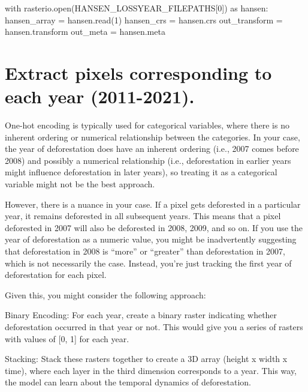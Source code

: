 \documentclass[
  letterpaper,
  DIV=11,
  numbers=noendperiod]{scrartcl}
\newenvironment{Shaded}{\begin{snugshade}}{\end{snugshade}}
\newcommand{\BuiltInTok}[1]{\textcolor[rgb]{0.00,0.23,0.31}{#1}}
\newcommand{\ControlFlowTok}[1]{\textcolor[rgb]{0.00,0.23,0.31}{#1}}
\newcommand{\DecValTok}[1]{\textcolor[rgb]{0.68,0.00,0.00}{#1}}
\newcommand{\ImportTok}[1]{\textcolor[rgb]{0.00,0.46,0.62}{#1}}
\newcommand{\NormalTok}[1]{\textcolor[rgb]{0.00,0.23,0.31}{#1}}
\newcommand{\OperatorTok}[1]{\textcolor[rgb]{0.37,0.37,0.37}{#1}}
\begin{document}
\begin{Shaded}
\begin{Highlighting}[]
\ControlFlowTok{with}\NormalTok{ rasterio.}\BuiltInTok{open}\NormalTok{(HANSEN\_LOSSYEAR\_FILEPATHS[}\DecValTok{0}\NormalTok{]) }\ImportTok{as}\NormalTok{ hansen:}
\NormalTok{    hansen\_array }\OperatorTok{=}\NormalTok{ hansen.read(}\DecValTok{1}\NormalTok{)}
\NormalTok{    hansen\_crs }\OperatorTok{=}\NormalTok{ hansen.crs}
\NormalTok{    out\_transform }\OperatorTok{=}\NormalTok{ hansen.transform}
\NormalTok{    out\_meta }\OperatorTok{=}\NormalTok{ hansen.meta}
\end{Highlighting}
\end{Shaded}

\hypertarget{extract-pixels-corresponding-to-each-year-2011-2021.}{%
\section{Extract pixels corresponding to each year
(2011-2021).}\label{extract-pixels-corresponding-to-each-year-2011-2021.}}

One-hot encoding is typically used for categorical variables, where
there is no inherent ordering or numerical relationship between the
categories. In your case, the year of deforestation does have an
inherent ordering (i.e., 2007 comes before 2008) and possibly a
numerical relationship (i.e., deforestation in earlier years might
influence deforestation in later years), so treating it as a categorical
variable might not be the best approach.

However, there is a nuance in your case. If a pixel gets deforested in a
particular year, it remains deforested in all subsequent years. This
means that a pixel deforested in 2007 will also be deforested in 2008,
2009, and so on. If you use the year of deforestation as a numeric
value, you might be inadvertently suggesting that deforestation in 2008
is ``more'' or ``greater'' than deforestation in 2007, which is not
necessarily the case. Instead, you're just tracking the first year of
deforestation for each pixel.

Given this, you might consider the following approach:

Binary Encoding: For each year, create a binary raster indicating
whether deforestation occurred in that year or not. This would give you
a series of rasters with values of {[}0, 1{]} for each year.

Stacking: Stack these rasters together to create a 3D array (height x
width x time), where each layer in the third dimension corresponds to a
year. This way, the model can learn about the temporal dynamics of
deforestation.
\end{document}
